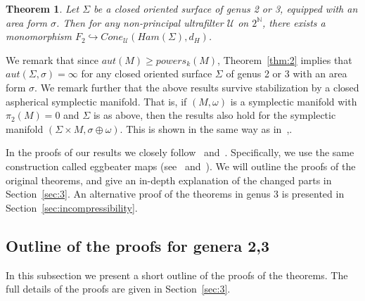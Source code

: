 \documentclass[11pt]{article}
\newtheorem{theorem}{Theorem}[section]
\newcommand{\N}{\mathbb{N}}
\begin{document}
        \begin{theorem}
        \label{thm:3}
            Let $\Sigma$ be a closed oriented surface of genus 2 or 3, equipped with an area form $\sigma$. Then for any non-principal ultrafilter $\mathcal{U}$ on $2^\N$, there exists a monomorphism $F_2 \hookrightarrow Cone_\mathcal{U}(Ham(\Sigma), d_H)$.
        \end{theorem}
        
        We remark that since $aut(M) \geq powers_k(M)$, Theorem~\ref{thm:2} implies that $aut(\Sigma, \sigma) = \infty$ for any closed oriented surface $\Sigma$ of genus 2 or 3 with an area form $\sigma$. We remark further that the above results survive stabilization by a closed aspherical symplectic manifold. That is, if $(M,\omega)$ is a symplectic manifold with $\pi_2(M) = 0$ and $\Sigma$ is as above, then the results also hold for the symplectic manifold $(\Sigma \times M, \sigma \oplus \omega)$. This is shown in the same way as in~\cite{PS14},\cite{10}.
        
        In the proofs of our results we closely follow~\cite{PS14} and~\cite{10}. Specifically, we use the same construction called eggbeater maps (see~\cite{PS14} and~\cite{FO}). We will outline the proofs of the original theorems, and give an in-depth explanation of the changed parts in Section~\ref{sec:3}. An alternative proof of the theorems in genus 3 is presented in Section~\ref{sec:incompressibility}.

    \subsection{Outline of the proofs for genera 2,3}
    \label{sec:outline}
        In this subsection we present a short outline of the proofs of the theorems. The full details of the proofs are given in Section~\ref{sec:3}. \\
        
\end{document}
